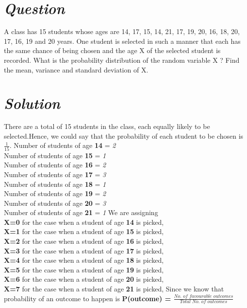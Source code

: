 \documentclass[journal,12pt,twocolumn]{IEEEtran}
\begin{document}
\section * {\emph{Question}}
A class has 15 students whose ages are 14, 17, 15, 14, 21, 17, 19, 20, 16, 18, 20, 17, 16, 19 and 20 years. One student is selected in such a manner that each has the same chance of being chosen and the age X of the selected student is recorded. What is the  probability distribution of the random variable X ? Find the  mean, variance and standard deviation of X.
\section*{\emph{Solution}}
There are a total of 15 students in the class, each equally likely to be selected.Hence, we could say that the probability of each student to be chosen is \textbf{$\frac{1}{15}$}.
   Number of students of age \textbf{14} = \emph{2}
\\ Number of students of age \textbf{15} = \emph{1}
\\ Number of students of age \textbf{16} = \emph{2}
\\ Number of students of age \textbf{17} = \emph{3}
\\ Number of students of age \textbf{18} = \emph{1}
\\ Number of students of age \textbf{19} = \emph{2}
\\ Number of students of age \textbf{20} = \emph{3}
\\ Number of students of age \textbf{21} = \emph{1}
We are assigning 
\\  \textbf{X=0} for the case when a student of age \textbf{14} is picked,
\\  \textbf{X=1} for the case when a student of age \textbf{15} is picked, 
\\  \textbf{X=2} for the case when a student of age \textbf{16} is picked,
\\  \textbf{X=3} for the case when a student of age \textbf{17} is picked,
\\  \textbf{X=4} for the case when a student of age \textbf{18} is picked,
\\  \textbf{X=5} for the case when a student of age \textbf{19} is picked,
\\  \textbf{X=6} for the case when a student of age \textbf{20} is picked,
\\  \textbf{X=7} for the case when a student of age \textbf{21} is picked,
Since we know that probability of an outcome to happen is \textbf{P(outcome) = $\frac{\textit{No. of favourable outcomes}} {\textit{Total No. of outcomes}}$}
\end{document}
